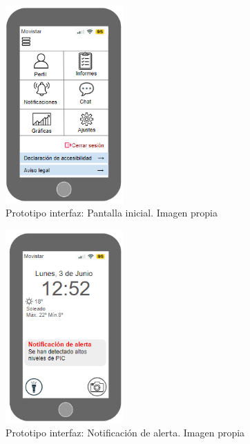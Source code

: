 \begin{figure}[h]
    \centering
    \includegraphics[width=0.4\textwidth]{img/pantallainicioapp.PNG}
    \caption{Prototipo interfaz: Pantalla inicial. Imagen propia}
    \label{fig:appini}
\end{figure}

\begin{figure}[h]
    \centering
    \includegraphics[width=0.4\textwidth]{img/appbloqueo.PNG}
    \caption{Prototipo interfaz: Notificación de alerta. Imagen propia}
    \label{fig:appalerta}
\end{figure}